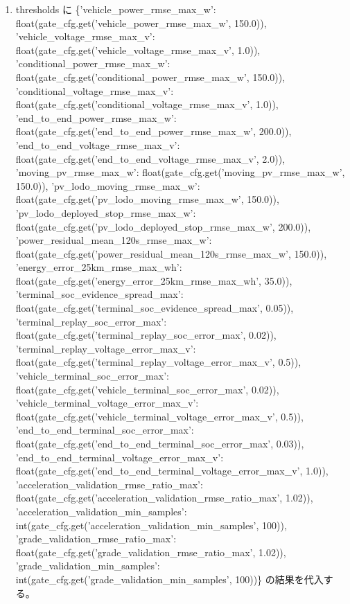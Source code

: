 \documentclass[a4paper,11pt]{article}
\begin{document}
\begin{enumerate}[leftmargin=1.8em]
\item thresholds に \{'vehicle\_power\_rmse\_max\_w': float(gate\_cfg.get('vehicle\_power\_rmse\_max\_w', 150.0)), 'vehicle\_voltage\_rmse\_max\_v': float(gate\_cfg.get('vehicle\_voltage\_rmse\_max\_v', 1.0)), 'conditional\_power\_rmse\_max\_w': float(gate\_cfg.get('conditional\_power\_rmse\_max\_w', 150.0)), 'conditional\_voltage\_rmse\_max\_v': float(gate\_cfg.get('conditional\_voltage\_rmse\_max\_v', 1.0)), 'end\_to\_end\_power\_rmse\_max\_w': float(gate\_cfg.get('end\_to\_end\_power\_rmse\_max\_w', 200.0)), 'end\_to\_end\_voltage\_rmse\_max\_v': float(gate\_cfg.get('end\_to\_end\_voltage\_rmse\_max\_v', 2.0)), 'moving\_pv\_rmse\_max\_w': float(gate\_cfg.get('moving\_pv\_rmse\_max\_w', 150.0)), 'pv\_lodo\_moving\_rmse\_max\_w': float(gate\_cfg.get('pv\_lodo\_moving\_rmse\_max\_w', 150.0)), 'pv\_lodo\_deployed\_stop\_rmse\_max\_w': float(gate\_cfg.get('pv\_lodo\_deployed\_stop\_rmse\_max\_w', 200.0)), 'power\_residual\_mean\_120s\_rmse\_max\_w': float(gate\_cfg.get('power\_residual\_mean\_120s\_rmse\_max\_w', 150.0)), 'energy\_error\_25km\_rmse\_max\_wh': float(gate\_cfg.get('energy\_error\_25km\_rmse\_max\_wh', 35.0)), 'terminal\_soc\_evidence\_spread\_max': float(gate\_cfg.get('terminal\_soc\_evidence\_spread\_max', 0.05)), 'terminal\_replay\_soc\_error\_max': float(gate\_cfg.get('terminal\_replay\_soc\_error\_max', 0.02)), 'terminal\_replay\_voltage\_error\_max\_v': float(gate\_cfg.get('terminal\_replay\_voltage\_error\_max\_v', 0.5)), 'vehicle\_terminal\_soc\_error\_max': float(gate\_cfg.get('vehicle\_terminal\_soc\_error\_max', 0.02)), 'vehicle\_terminal\_voltage\_error\_max\_v': float(gate\_cfg.get('vehicle\_terminal\_voltage\_error\_max\_v', 0.5)), 'end\_to\_end\_terminal\_soc\_error\_max': float(gate\_cfg.get('end\_to\_end\_terminal\_soc\_error\_max', 0.03)), 'end\_to\_end\_terminal\_voltage\_error\_max\_v': float(gate\_cfg.get('end\_to\_end\_terminal\_voltage\_error\_max\_v', 1.0)), 'acceleration\_validation\_rmse\_ratio\_max': float(gate\_cfg.get('acceleration\_validation\_rmse\_ratio\_max', 1.02)), 'acceleration\_validation\_min\_samples': int(gate\_cfg.get('acceleration\_validation\_min\_samples', 100)), 'grade\_validation\_rmse\_ratio\_max': float(gate\_cfg.get('grade\_validation\_rmse\_ratio\_max', 1.02)), 'grade\_validation\_min\_samples': int(gate\_cfg.get('grade\_validation\_min\_samples', 100))\} の結果を代入する。
            \end{enumerate}
\end{document}
